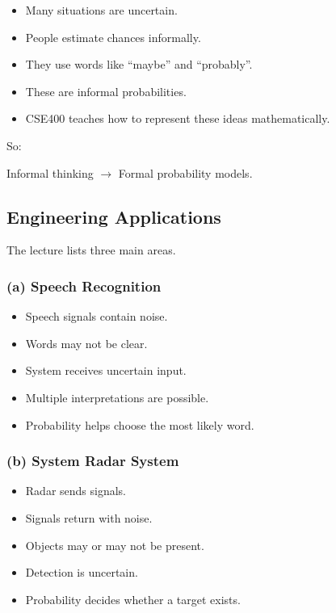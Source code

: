 \documentclass[12pt]{article}
\begin{document}
\begin{itemize}
\item Many situations are uncertain.
\item People estimate chances informally.
\item They use words like ``maybe'' and ``probably''.
\item These are informal probabilities.
\item CSE400 teaches how to represent these ideas mathematically.
\end{itemize}

So:

\begin{center}
Informal thinking $\rightarrow$ Formal probability models.
\end{center}

\subsection{Engineering Applications}

The lecture lists three main areas.

\subsubsection{(a) Speech Recognition}

\begin{itemize}
\item Speech signals contain noise.
\item Words may not be clear.
\item System receives uncertain input.
\item Multiple interpretations are possible.
\item Probability helps choose the most likely word.
\end{itemize}

\subsubsection{(b) System Radar System}

\begin{itemize}
\item Radar sends signals.
\item Signals return with noise.
\item Objects may or may not be present.
\item Detection is uncertain.
\item Probability decides whether a target exists.
\end{itemize}
\end{document}
